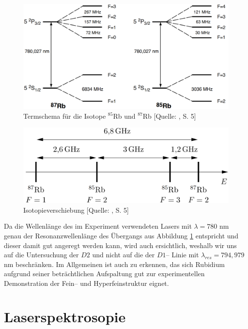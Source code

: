 \begin{figure}[!h]
    \centering
    \includegraphics[scale = 0.45]{figures/images/termschema.png}
    \caption{Termschema für die Isotope $^{85}$Rb und $^{87}$Rb [Quelle: \cite{Krükow}, S. 5]}
    \label{fig:termschema}
\end{figure}

\begin{figure}
    \centering
    \includegraphics[scale = 0.28]{figures/images/isotopieverschiebung.png}
    \caption{Isotopieverschiebung [Quelle: \cite{Krükow}, S. 5]}
    \label{fig:isotopieverschiebung}
\end{figure}

\noindent Da die Wellenlänge des im Experiment verwendeten Lasers mit $\lambda = 780$ nm genau der Resonanzwellenlänge des Übergangs aus Abbildung \ref{fig:termschema} entspricht und dieser damit gut angeregt werden kann, wird auch ersichtlich, weshalb wir uns auf die Untersuchung der $D2$ und nicht auf die der $D1$-- Linie mit $\lambda_{res}= 794,979$ nm \cite{Steck85,Steck87} beschränken. Im Allgemeinen ist auch zu erkennen, das sich Rubidium aufgrund seiner beträchtlichen Aufspaltung gut zur experimentellen Demonstration der Fein-- und Hyperfeinstruktur eignet.


\section{Laserspektrosopie}


